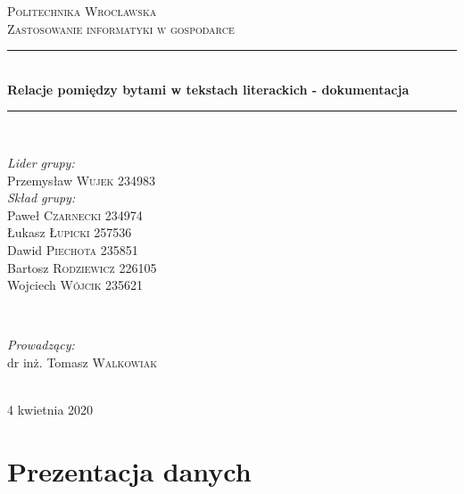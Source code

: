 \documentclass[12pt,a4paper]{article} %
\begin{document}
\begin{titlepage}

\newcommand{\HRule}{\rule{\linewidth}{0.5mm}}

\center
 
\textsc{\LARGE Politechnika Wrocławska}\\[1.5cm] 
\textsc{\Large Zastosowanie informatyki w gospodarce}\\[0.5cm]

\HRule \\[0.5cm]
{ \huge \bfseries Relacje pomiędzy bytami w tekstach literackich - dokumentacja}\\[0.2cm]
\HRule \\[1.6cm]
 
 
\begin{minipage}{0.4\textwidth}
\begin{flushleft} \large
\emph{Lider grupy:}\\
Przemysław \textsc{Wujek} 234983\\
\emph{Skład grupy:}\\
Paweł \textsc{Czarnecki} 234974\\
Łukasz \textsc{Łupicki} 257536\\
Dawid \textsc{Piechota} 235851\\
Bartosz \textsc{Rodziewicz} 226105\\
Wojciech \textsc{Wójcik} 235621\\
\end{flushleft}
\end{minipage}
~
\begin{minipage}{0.4\textwidth}
\begin{flushright} \large
\emph{Prowadzący:} \\
dr inż. Tomasz \textsc{Walkowiak} 
\end{flushright}
\end{minipage}\\[4cm]

\vfill
{\large 4 kwietnia 2020}

\end{titlepage}
   
\newpage

\section{Prezentacja danych}
\end{document}
